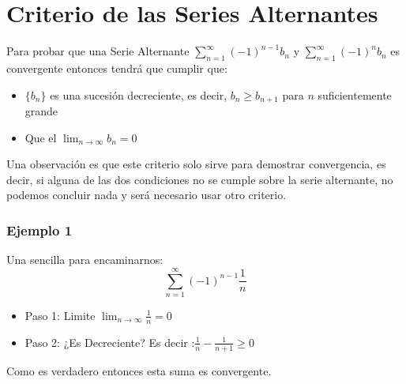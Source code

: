 \documentclass[12pt]{report}                                %
\begin{document}
    \clearpage
    \section{Criterio de las Series Alternantes}

        Para probar que una Serie Alternante $\sum_{n=1}^{\infty} (-1)^{n-1} b_n$ y $\sum_{n=1}^{\infty} (-1)^n b_n$ es convergente entonces tendrá que cumplir que:

        \begin{itemize}
            \item $\{b_n\}$ es una sucesión decreciente, es decir, $b_n \geq b_{n+1}$ para $n$ suficientemente grande
            \item Que el $\lim_{n \to \infty} b_n = 0$
        \end{itemize}

        Una observación es que este criterio solo sirve para demostrar convergencia, es decir, si alguna de las dos condiciones no se cumple sobre la serie alternante, no podemos concluir nada y será necesario usar otro criterio.

        \subsubsection{Ejemplo 1}
            Una sencilla para encaminarnos:
            \begin{equation*}
                \sum_{n=1}^{\infty} (-1)^{n-1} \frac{1}{n}
            \end{equation*}


             \begin{itemize}
                \item Paso 1: Limite $\lim_{n \to \infty} \frac{1}{n}=0$
                \item Paso 2: ¿Es Decreciente? Es decir :$\frac{1}{n}-\frac{1}{n+1} \geq 0 $
             \end{itemize}

            Como es verdadero entonces esta suma es convergente.



    \clearpage
\end{document}
